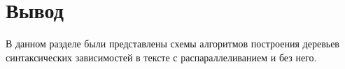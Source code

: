 \clearpage

\section*{Вывод}

В данном разделе были представлены схемы алгоритмов построения деревьев синтаксических зависимостей в тексте с распараллеливанием и без него.